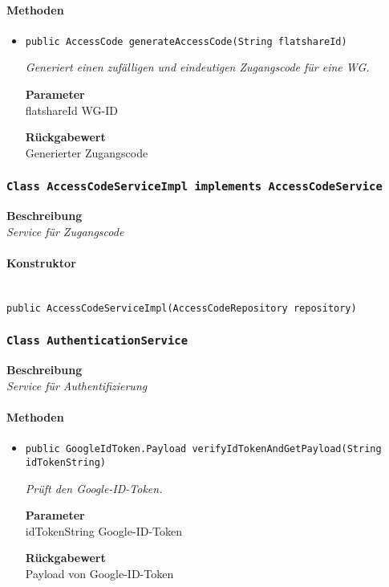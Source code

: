      \paragraph*{Methoden}
     \begin{itemize}
     	\item{\texttt{public AccessCode generateAccessCode(String flatshareId)}}
     	
     	\textit{Generiert einen zufälligen und eindeutigen Zugangscode für eine WG.}
     	
     	\textbf{Parameter} \\
     	flatshareId WG-ID
     	
     	\textbf{Rückgabewert} \\
     	Generierter Zugangscode
     \end{itemize}
     \subsubsection{\texttt{Class AccessCodeServiceImpl implements AccessCodeService}}
     \textbf{Beschreibung} \\
     \textit{Service für Zugangscode}
     \paragraph*{Konstruktor}\mbox{} \\
     \texttt{public AccessCodeServiceImpl(AccessCodeRepository repository)} \\
     \subsubsection{\texttt{Class AuthenticationService}}
     \textbf{Beschreibung} \\
     \textit{Service für Authentifizierung}
     \paragraph*{Methoden}
     \begin{itemize}
     	\item{\texttt{public GoogleIdToken.Payload verifyIdTokenAndGetPayload(String idTokenString)}}
     	
     	\textit{Prüft den Google-ID-Token.}
     	
     	\textbf{Parameter} \\
     	idTokenString Google-ID-Token
     	
     	\textbf{Rückgabewert} \\
     	Payload von Google-ID-Token
     \end{itemize}
